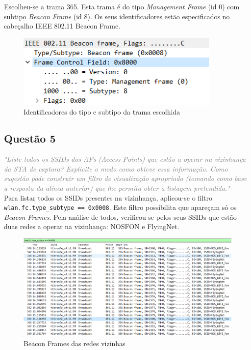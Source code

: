 \documentclass{llncs}
\newcommand{\questionE}[1]{\textcolor{gray}{\textit{"#1"}}}
\begin{document}
Escolheu-se a trama 365. Esta trama é do tipo \textit{Management Frame} (id 0) com subtipo \textit{Beacon Frame} (id 8). Os seus identificadores estão especificados no cabeçalho IEEE 802.11 Beacon Frame.

\begin{figure}[H]
\begin{center}
\includegraphics[width=10cm]{4.PNG}
\end{center}
\caption{Identificadores do tipo e subtipo da trama escolhida}
\end{figure}

\clearpage

\subsection*{Questão 5}
\hspace{3mm} 
\questionE{Liste todos os SSIDs dos APs (Access Points) que estão a operar na vizinhança da STA de captura? Explicite o modo como obteve essa informação. Como sugestão pode construir um filtro de visualização apropriado (tomando como base a resposta da alínea anterior) que lhe permita obter a listagem pretendida.}\\ 

Para listar todos os SSIDs presentes na vizinhança, aplicou-se o filtro \texttt{wlan.fc.type\_subtype == 0x0008}. Este filtro possibilita que apareçam só os \textit{Beacon Frames}. Pela análise de todos, verificou-se pelos seus SSIDs que estão duas redes a operar na vizinhança: NOSFON e FlyingNet.

\begin{figure}[H]
\begin{center}
\includegraphics[width=12cm]{5.PNG}
\end{center}
\caption{Beacon Frames das redes vizinhas}
\end{figure}
\end{document}
